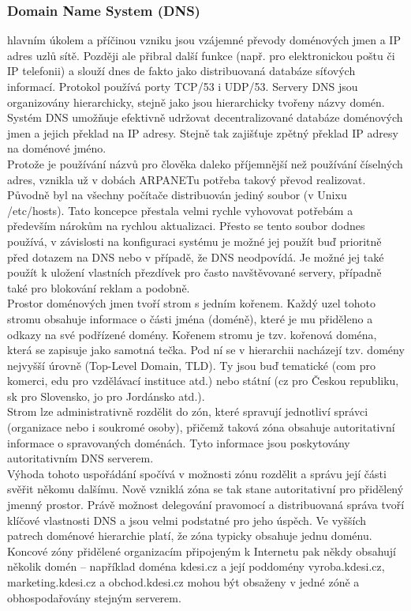 \documentclass[10pt,a4paper]{article}
\begin{document}
\subsubsection{Domain Name System (DNS)}
hlavním úkolem a příčinou vzniku jsou vzájemné převody doménových jmen a IP adres uzlů sítě. Později ale přibral další funkce (např. pro elektronickou poštu či IP telefonii) a slouží dnes de fakto jako distribuovaná databáze síťových informací. Protokol používá porty TCP/53 i UDP/53. Servery DNS jsou organizovány hierarchicky, stejně jako jsou hierarchicky tvořeny názvy domén. Systém DNS umožňuje efektivně udržovat decentralizované databáze doménových jmen a jejich překlad na IP adresy. Stejně tak zajišťuje zpětný překlad IP adresy na doménové jméno. \\
Protože je používání názvů pro člověka daleko příjemnější než používání číselných adres, vznikla už v dobách ARPANETu potřeba takový převod realizovat. Původně byl na všechny počítače distribuován jediný soubor (v Unixu /etc/hosts). Tato koncepce přestala velmi rychle vyhovovat potřebám a především nárokům na rychlou aktualizaci. Přesto se tento soubor dodnes používá, v závislosti na konfiguraci systému je možné jej použít buď prioritně před dotazem na DNS nebo v případě, že DNS neodpovídá. Je možné jej také použít k uložení vlastních přezdívek pro často navštěvované servery, případně také pro blokování reklam a podobně. \\
Prostor doménových jmen tvoří strom s jedním kořenem. Každý uzel tohoto stromu obsahuje informace o části jména (doméně), které je mu přiděleno a odkazy na své podřízené domény. Kořenem stromu je tzv. kořenová doména, která se zapisuje jako samotná tečka. Pod ní se v hierarchii nacházejí tzv. domény nejvyšší úrovně (Top-Level Domain, TLD). Ty jsou buď tematické (com pro komerci, edu pro vzdělávací instituce atd.) nebo státní (cz pro Českou republiku, sk pro Slovensko, jo pro Jordánsko atd.). \\
Strom lze administrativně rozdělit do zón, které spravují jednotliví správci (organizace nebo i soukromé osoby), přičemž taková zóna obsahuje autoritativní informace o spravovaných doménách. Tyto informace jsou poskytovány autoritativním DNS serverem. \\
Výhoda tohoto uspořádání spočívá v možnosti zónu rozdělit a správu její části svěřit někomu dalšímu. Nově vzniklá zóna se tak stane autoritativní pro přidělený jmenný prostor. Právě možnost delegování pravomocí a distribuovaná správa tvoří klíčové vlastnosti DNS a jsou velmi podstatné pro jeho úspěch. Ve vyšších patrech doménové hierarchie platí, že zóna typicky obsahuje jednu doménu. Koncové zóny přidělené organizacím připojeným k Internetu pak někdy obsahují několik domén – například doména kdesi.cz a její poddomény vyroba.kdesi.cz, marketing.kdesi.cz a obchod.kdesi.cz mohou být obsaženy v jedné zóně a obhospodařovány stejným serverem. \\
\end{document}
